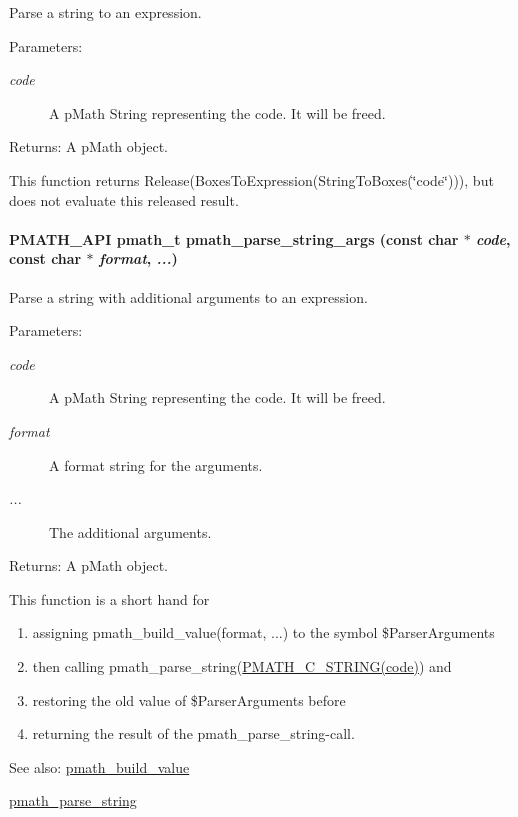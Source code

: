 Parse a string to an expression. 

\begin{Desc}
\item[Parameters:]
\begin{description}
\item[{\em code}]A pMath String representing the code. It will be freed. \end{description}
\end{Desc}
\begin{Desc}
\item[Returns:]A pMath object.\end{Desc}
This function returns Release(BoxesToExpression(StringToBoxes(\char`\"{}code\char`\"{}))), but does not evaluate this released result. \hypertarget{group__parser_gac02e250fcd91e4fc03f0f7e8a6dd571}{
\paragraph[{pmath\_\-parse\_\-string\_\-args}]{\setlength{\rightskip}{0pt plus 5cm}PMATH\_\-API {\bf pmath\_\-t} pmath\_\-parse\_\-string\_\-args (const char $\ast$ {\em code}, \/  const char $\ast$ {\em format}, \/   {\em ...})}\hfill}
\label{group__parser_gac02e250fcd91e4fc03f0f7e8a6dd571}


Parse a string with additional arguments to an expression. 

\begin{Desc}
\item[Parameters:]
\begin{description}
\item[{\em code}]A pMath String representing the code. It will be freed. \item[{\em format}]A format string for the arguments. \item[{\em ...}]The additional arguments. \end{description}
\end{Desc}
\begin{Desc}
\item[Returns:]A pMath object.\end{Desc}
This function is a short hand for\begin{enumerate}
\item assigning pmath\_\-build\_\-value(format, ...) to the symbol \$ParserArguments\item then calling pmath\_\-parse\_\-string(\hyperlink{group__strings_g0b6ecb1bc5d8aeccbbfaeb72055c7ffc}{PMATH\_\-C\_\-STRING(code)}) and\item restoring the old value of \$ParserArguments before\item returning the result of the pmath\_\-parse\_\-string-call.\end{enumerate}


\begin{Desc}
\item[See also:]\hyperlink{group__helpers_g13a748aa283c5f5408cce037d3ad224d}{pmath\_\-build\_\-value} 

\hyperlink{group__parser_g30c73f2fbcd116125cb5befd26b35ec4}{pmath\_\-parse\_\-string} \end{Desc}
